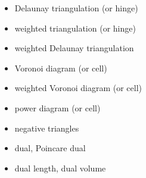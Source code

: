 \documentclass[10pt]{article}%
\begin{document}
\begin{itemize}
\item  Delaunay triangulation (or hinge)
\item  weighted triangulation (or hinge)
\item  weighted Delaunay triangulation
\item  Voronoi diagram (or cell)
\item  weighted Voronoi diagram (or cell)
\item  power diagram (or cell)
\item  negative triangles
\item  dual, Poincare dual
\item  dual length, dual volume
\end{itemize}
    

%
\end{document}
